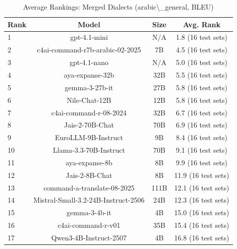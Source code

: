 \begin{table}[htbp]
\centering
\caption{Average Rankings: Merged Dialects (arabic\textbackslash{}_general, BLEU)}
\label{tab:avg_rankings_bleu_arabic_general}
\begin{tabular}{l@{\hspace{3pt}}c@{\hspace{3pt}}c@{\hspace{3pt}}c}
\toprule
Rank & Model & Size & Avg. Rank \\
\midrule
1 & gpt-4.1-mini & N/A & 1.8 (16 test sets) \\
2 & c4ai-command-r7b-arabic-02-2025 & 7B & 4.5 (16 test sets) \\
3 & gpt-4.1-nano & N/A & 5.0 (16 test sets) \\
4 & aya-expanse-32b & 32B & 5.5 (16 test sets) \\
5 & gemma-3-27b-it & 27B & 5.8 (16 test sets) \\
6 & Nile-Chat-12B & 12B & 5.8 (16 test sets) \\
7 & c4ai-command-r-08-2024 & 32B & 6.7 (16 test sets) \\
8 & Jais-2-70B-Chat & 70B & 6.9 (16 test sets) \\
9 & EuroLLM-9B-Instruct & 9B & 8.4 (16 test sets) \\
10 & Llama-3.3-70B-Instruct & 70B & 9.1 (16 test sets) \\
11 & aya-expanse-8b & 8B & 9.9 (16 test sets) \\
12 & Jais-2-8B-Chat & 8B & 11.9 (16 test sets) \\
13 & command-a-translate-08-2025 & 111B & 12.1 (16 test sets) \\
14 & Mistral-Small-3.2-24B-Instruct-2506 & 24B & 12.3 (16 test sets) \\
15 & gemma-3-4b-it & 4B & 15.0 (16 test sets) \\
16 & c4ai-command-r-v01 & 35B & 15.4 (16 test sets) \\
17 & Qwen3-4B-Instruct-2507 & 4B & 16.8 (16 test sets) \\
\bottomrule
\end{tabular}
\end{table}